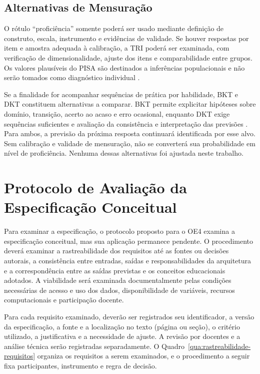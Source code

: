 \subsection{Alternativas de Mensuração}

O rótulo ``proficiência'' somente poderá ser usado mediante definição de construto, escala, instrumento e evidências de validade. Se houver respostas por item e amostra adequada à calibração, a TRI poderá ser examinada, com verificação de dimensionalidade, ajuste dos itens e comparabilidade entre grupos. Os valores plausíveis do PISA são destinados a inferências populacionais e não serão tomados como diagnóstico individual \cite{OECDTechnical2024}.

Se a finalidade for acompanhar sequências de prática por habilidade, BKT e DKT constituem alternativas a comparar. BKT permite explicitar hipóteses sobre domínio, transição, acerto ao acaso e erro ocasional, enquanto DKT exige sequências suficientes e avaliação da consistência e interpretação das previsões \cite{Abdelrahman2023}. Para ambos, a previsão da próxima resposta continuará identificada por esse alvo. Sem calibração e validade de mensuração, não se converterá sua probabilidade em nível de proficiência. Nenhuma dessas alternativas foi ajustada neste trabalho.

\section{Protocolo de Avaliação da Especificação Conceitual}
\label{sec:protocolo-avaliacao}

Para examinar a especificação, o protocolo proposto para o OE4 examina a especificação conceitual, mas sua aplicação permanece pendente. O procedimento deverá examinar a rastreabilidade dos requisitos até as fontes ou decisões autorais, a consistência entre entradas, saídas e responsabilidades da arquitetura e a correspondência entre as saídas previstas e os conceitos educacionais adotados. A viabilidade será examinada documentalmente pelas condições necessárias de acesso e uso dos dados, disponibilidade de variáveis, recursos computacionais e participação docente.

Para cada requisito examinado, deverão ser registrados seu identificador, a versão da especificação, a fonte e a localização no texto (página ou seção), o critério utilizado, a justificativa e a necessidade de ajuste. A revisão por docentes e a análise técnica serão registradas separadamente. O Quadro~\ref{qua:rastreabilidade-requisitos} organiza os requisitos a serem examinados, e o procedimento a seguir fixa participantes, instrumento e regra de decisão.

